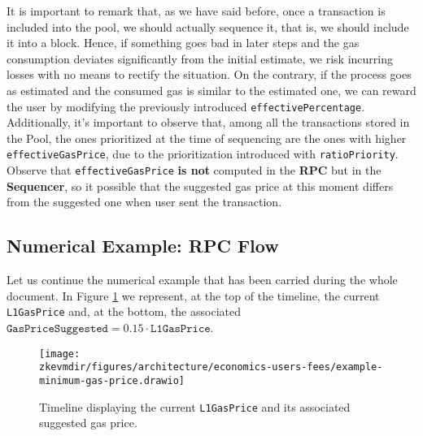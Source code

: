 It is important to remark that, as we have said before, once a transaction is included into the pool, we should actually sequence it, that is, we should include it into a block. Hence, if something goes bad in later steps and the gas consumption deviates significantly from the initial estimate, we risk incurring losses with no means to rectify the situation. On the contrary, if the process goes as estimated and the consumed gas is similar to the estimated one, we can reward the user by modifying the previously introduced \texttt{effectivePercentage}. Additionally, it’s important to observe that, among all the transactions stored in the Pool, the ones prioritized at the time of sequencing are the ones with higher \texttt{effectiveGasPrice}, due to the prioritization introduced with \texttt{ratioPriority}. Observe that \texttt{effectiveGasPrice} \textbf{is not} computed in the \textbf{RPC} but in the \textbf{Sequencer}, so it possible that the suggested gas price at this moment differs from the suggested one when user sent the transaction.



\subsection{Numerical Example: RPC Flow} \label{sec:numerical-example-rpc}

Let us continue the numerical example that has been carried during the whole document. In Figure \ref{fig:numerical-example-rpc} we represent, at the top of the timeline, the current \texttt{L1GasPrice} and, at the bottom, the associated $\texttt{GasPriceSuggested} = 0.15 \cdot \texttt{L1GasPrice}$.

\begin{figure}[H]
\centering
\texttt{[image: \\zkevmdir/figures/architecture/economics-users-fees/example-minimum-gas-price.drawio]}
\caption{Timeline displaying the current \texttt{L1GasPrice} and its associated suggested gas price. }
\label{fig:numerical-example-rpc}
\end{figure}

